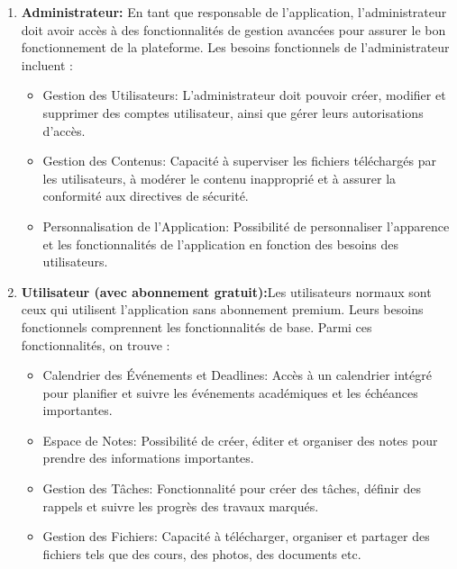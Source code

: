 \begin{enumerate}
  \item \textbf{Administrateur: } En tant que responsable de l'application, l'administrateur doit avoir accès à des fonctionnalités de gestion avancées pour assurer le bon fonctionnement de la plateforme. Les besoins fonctionnels de l'administrateur incluent :
  \vspace{4mm}
        \begin{itemize}[label=$\bullet$]
          \item Gestion des Utilisateurs: L'administrateur doit pouvoir créer, modifier et supprimer des comptes utilisateur, ainsi que gérer leurs autorisations d'accès.
          \vspace{3mm}
          \item Gestion des Contenus: Capacité à superviser les fichiers téléchargés par les utilisateurs, à modérer le contenu inapproprié et à assurer la conformité aux directives de sécurité.
          \vspace{3mm}
          \item Personnalisation de l'Application: Possibilité de personnaliser l'apparence et les fonctionnalités de l'application en fonction des besoins des utilisateurs.
        \end{itemize}
\vspace{5mm}
  \item \textbf{Utilisateur (avec abonnement gratuit):}Les utilisateurs normaux sont ceux qui utilisent l'application sans abonnement premium. Leurs besoins fonctionnels comprennent les fonctionnalités de base. Parmi ces fonctionnalités, on trouve :
  \vspace{4mm}
        \begin{itemize}[label=$\bullet$]
          \item Calendrier des Événements et Deadlines: Accès à un calendrier intégré pour planifier et suivre les événements académiques et les échéances importantes.
          \vspace{3mm}
          \item Espace de Notes: Possibilité de créer, éditer et organiser des notes pour prendre des informations importantes.
          \vspace{3mm}
          \item  Gestion des Tâches: Fonctionnalité pour créer des tâches, définir des rappels et suivre les progrès des travaux marqués.
          \vspace{3mm}
          \item Gestion des Fichiers: Capacité à télécharger, organiser et partager des fichiers tels que des cours, des photos, des documents etc.


\end{itemize}
\end{enumerate}

